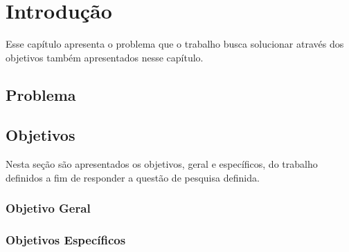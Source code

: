 \chapter[Introdução]{Introdução}

Esse capítulo apresenta o problema que o trabalho busca solucionar através dos objetivos também apresentados nesse capítulo.

\section{Problema}

  
\section{Objetivos}

  Nesta seção são apresentados os objetivos, geral e específicos, do trabalho definidos a fim de responder a questão de pesquisa definida.

\subsection{Objetivo Geral}


\subsection{Objetivos Específicos}


